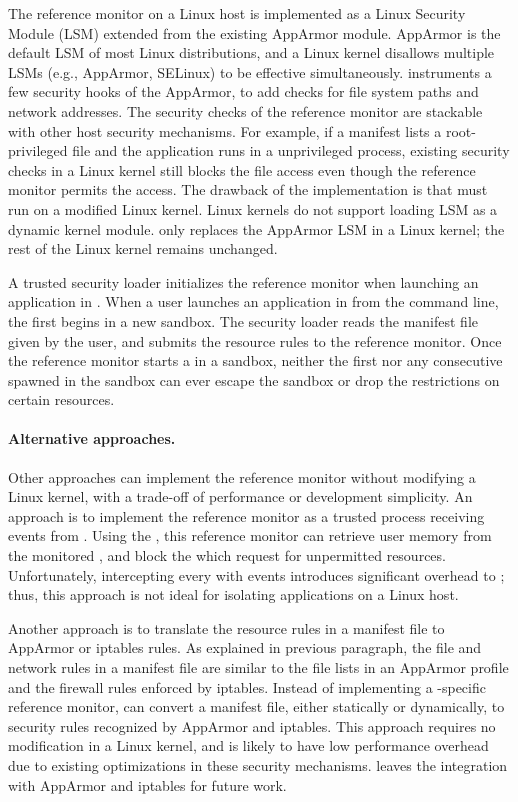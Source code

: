The reference monitor on a Linux host
is implemented as a Linux Security Module (LSM) extended from the existing AppArmor module.
AppArmor is the default LSM of most Linux distributions,
and a Linux kernel disallows multiple LSMs (e.g., AppArmor, SELinux) to be effective simultaneously.
\graphene{} instruments
a few security hooks of the AppArmor, to add checks for file system paths
and network addresses.
The security checks of the reference monitor are stackable with other host security mechanisms.
For example, if a manifest lists a root-privileged file and the \graphene{} application runs in a unprivileged process,
existing security checks in a Linux kernel
still blocks the file access even though the reference monitor permits the access.
The drawback of the implementation
is that \graphene{} must run on a modified Linux kernel.
Linux kernels do not support loading LSM as a dynamic kernel module.
\graphene{} only replaces
the AppArmor LSM in a Linux kernel; the rest of the Linux kernel remains unchanged.


A trusted security loader initializes the reference monitor
when launching an application in \graphene{}.
When a user launches an application in \graphene{} from the command line,
the first \picoproc{} begins in a new sandbox.
The security loader
reads the manifest file given by the user,
and submits the resource rules to the reference monitor.
Once the reference monitor
starts a \picoproc{} in a sandbox, neither the first \picoproc{} nor any consecutive \picoprocs{} spawned in the sandbox can ever escape the sandbox or drop the restrictions on certain resources.


\paragraph{Alternative approaches.}
Other approaches can implement the reference monitor without modifying a Linux kernel, with a trade-off of performance or development simplicity.
An approach is to implement the reference monitor as a trusted process receiving  events from \graphene{} \picoprocs{}.
Using the  \linuxapi{}, this reference monitor can retrieve user memory from the monitored \picoprocs{},
and block the \linuxapis{} which request for unpermitted resources.
Unfortunately, intercepting every \linuxapis{} with  events introduces significant overhead to \hostapis{};
thus, this approach is not ideal for isolating \graphene{} applications on a Linux host.


Another approach is to translate the resource rules in a manifest file
to AppArmor or iptables rules.
As explained in previous paragraph, the file and network rules in a manifest file are similar to the file lists in an AppArmor profile and the firewall rules enforced by iptables.
Instead of implementing a \graphene{}-specific reference monitor,
\graphene{} can convert a manifest file, either statically or dynamically,
to security rules recognized by AppArmor and iptables.
This approach requires no modification
in a Linux kernel, and is likely to have low performance overhead
due to existing optimizations in these security mechanisms.
\graphene{} leaves the integration with AppArmor and iptables for future work.




